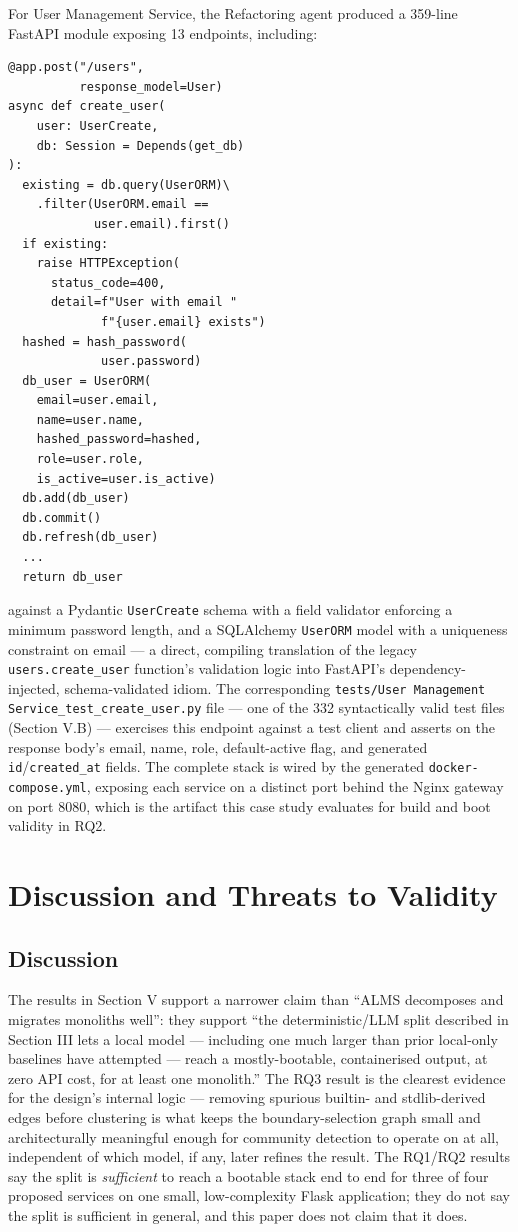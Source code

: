 \documentclass[conference]{IEEEtran}
\begin{document}
For User Management Service, the Refactoring agent produced a 359-line FastAPI module exposing 13 endpoints, including:
{\footnotesize
\begin{verbatim}
@app.post("/users",
          response_model=User)
async def create_user(
    user: UserCreate,
    db: Session = Depends(get_db)
):
  existing = db.query(UserORM)\
    .filter(UserORM.email ==
            user.email).first()
  if existing:
    raise HTTPException(
      status_code=400,
      detail=f"User with email "
             f"{user.email} exists")
  hashed = hash_password(
             user.password)
  db_user = UserORM(
    email=user.email,
    name=user.name,
    hashed_password=hashed,
    role=user.role,
    is_active=user.is_active)
  db.add(db_user)
  db.commit()
  db.refresh(db_user)
  ...
  return db_user
\end{verbatim}
}
against a Pydantic \texttt{UserCreate} schema with a field validator enforcing a minimum password length, and a SQLAlchemy \texttt{UserORM} model with a uniqueness constraint on email --- a direct, compiling translation of the legacy \texttt{users.create\_user} function's validation logic into FastAPI's dependency-injected, schema-validated idiom. The corresponding \texttt{tests/User Management Service\_test\_create\_user.py} file --- one of the 332 syntactically valid test files (Section V.B) --- exercises this endpoint against a test client and asserts on the response body's email, name, role, default-active flag, and generated \texttt{id}/\texttt{created\_at} fields. The complete stack is wired by the generated \texttt{docker-compose.yml}, exposing each service on a distinct port behind the Nginx gateway on port 8080, which is the artifact this case study evaluates for build and boot validity in RQ2.

\section{Discussion and Threats to Validity}

\subsection{Discussion}

The results in Section V support a narrower claim than ``ALMS decomposes and migrates monoliths well'': they support ``the deterministic/LLM split described in Section III lets a local model --- including one much larger than prior local-only baselines have attempted --- reach a mostly-bootable, containerised output, at zero API cost, for at least one monolith.'' The RQ3 result is the clearest evidence for the design's internal logic --- removing spurious builtin- and stdlib-derived edges before clustering is what keeps the boundary-selection graph small and architecturally meaningful enough for community detection to operate on at all, independent of which model, if any, later refines the result. The RQ1/RQ2 results say the split is \textit{sufficient} to reach a bootable stack end to end for three of four proposed services on one small, low-complexity Flask application; they do not say the split is sufficient in general, and this paper does not claim that it does.
\end{document}
